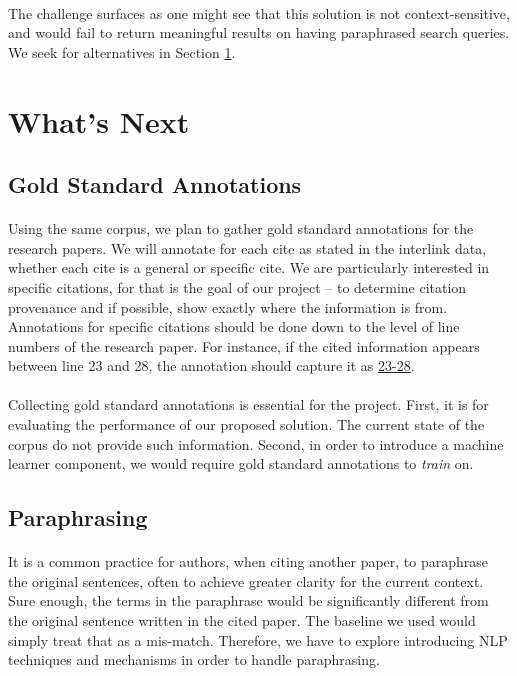 \documentclass[12 pt]{article}
\begin{document}
\paragraph{}
The challenge surfaces as one might see that this solution is not context-sensitive, and would fail to return meaningful results on having paraphrased search queries. We seek for alternatives in Section \ref{whatsnext}.

\section{What's Next}
\label{whatsnext}
\subsection{Gold Standard Annotations}
\paragraph{}
Using the same corpus, we plan to gather gold standard annotations for the research papers. We will annotate for each cite as stated in the interlink data, whether each cite is a general or specific cite. We are particularly interested in specific citations, for that is the goal of our project -- to determine citation provenance and if possible, show exactly where the information is from. Annotations for specific citations should be done down to the level of line numbers of the research paper. For instance, if the cited information appears between line 23 and 28, the annotation should capture it as \url{23-28}.

\paragraph{}
Collecting gold standard annotations is essential for the project. First, it is for evaluating the performance of our proposed solution. The current state of the corpus do not provide such information. Second, in order to introduce a machine learner component, we would require gold standard annotations to \textit{train} on.

\subsection{Paraphrasing}
\paragraph{}
It is a common practice for authors, when citing another paper, to paraphrase the original sentences, often to achieve greater clarity for the current context. Sure enough, the terms in the paraphrase would be significantly different from the original sentence written in the cited paper. The baseline we used would simply treat that as a mis-match. Therefore, we have to explore introducing NLP techniques and mechanisms in order to handle paraphrasing.

\end{document}
